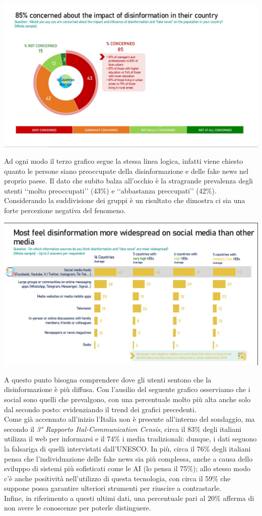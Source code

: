 \documentclass{article}
\begin{document}
\begin{justify}
\begin{center}
\includegraphics[width=0.6\linewidth]{Immagini/Grafico3.jpg}\\
\end{center}
    Ad ogni modo il terzo grafico segue la stessa linea logica, infatti viene chiesto quanto le persone siano preoccupate della disinformazione e delle fake news nel proprio paese.
    Il dato che subito balza all'occhio è la stragrande prevalenza degli utenti ‘‘molto preoccupati’’ (43\%) e ‘‘abbastanza preccupati’’ (42\%). Considerando la suddivisione dei gruppi è un risultato che dimostra ci sia una forte percezione negativa del fenomeno.

\begin{center}
\includegraphics[width=0.6\linewidth]{Immagini/Grafico4.jpg}\\
\end{center}
    A questo punto bisogna comprendere dove gli utenti sentono che la disinformazione è più diffusa. Con l'ausilio del seguente grafico osserviamo che i social sono quelli che prevalgono, con una percentuale molto più alta anche solo dal secondo posto: evidenziando il trend dei grafici precedenti.\\
    Come già accennato all'inizio l'Italia non è presente all'interno del sondaggio, ma secondo il \textit{3° Rapporto Ital-Communication Censis}, circa il 83\% degli italiani utilizza il web per informarsi e il 74\% i media tradizionali: dunque, i dati seguono la falsariga di quelli intervistati dall'UNESCO.
    In più, circa il 76\% degli italiani pensa che l'individuazione delle fake news sia più complessa, anche a causa dello sviluppo di sistemi più sofisticati come le AI (lo pensa il 75\%); allo stesso modo c'è anche positività nell'utilizzo di questa tecnologia, con circa il 59\% che suppone possa garantire ulteriori strumenti per riuscire a contrastarle.\\
    Infine, in riferimento a questi ultimi dati, una percentuale pari al 20\% afferma di non avere le conoscenze per poterle distinguere.\citep{chiariello_disinformazione_2023}
\end{justify}
\end{document}
